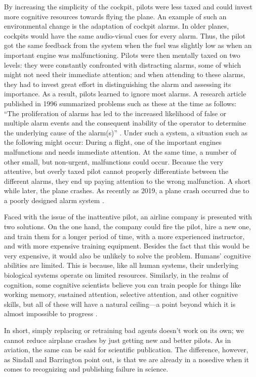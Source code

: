 \documentclass[editorial, authordate,twocolumn,issue]{jote-new-article}
\begin{document}
By increasing the simplicity of the cockpit, pilots were less taxed and could invest more cognitive resources towards flying the plane. An example of such an environmental change is the adaptation of cockpit alarms. In older planes, cockpits would have the same audio-visual cues for every alarm. Thus, the pilot got the same feedback from the system when the fuel was slightly low as when an important engine was malfunctioning. Pilots were then mentally taxed on two levels: they were constantly confronted with distracting alarms, some of which might not need their immediate attention; and when attending to these alarms, they had to invest great effort in distinguishing the alarm and assessing its importance. As a result, pilots learned to ignore most alarms. A research article published in 1996 summarized problems such as these at the time as follows: “The proliferation of alarms has led to the increased likelihood of false or multiple alarm events and the consequent inability of the operator to determine the underlying cause of the alarm(s)” \parencite[pp. 12]{Gilson1996}. Under such a system, a situation such as the following might occur: During a flight, one of the important engines malfunctions and needs immediate attention. At the same time, a number of other small, but non-urgent, malfunctions could occur. Because the very attentive, but overly taxed pilot cannot properly differentiate between the different alarms, they end up paying attention to the wrong malfunction. A short while later, the plane crashes. As recently as 2019, a plane crash occurred due to a poorly designed alarm system \parencite{Levin2019}. 

Faced with the issue of the inattentive pilot, an airline company is presented with two solutions. On the one hand, the company could fire the pilot, hire a new one, and train them for a longer period of time, with a more experienced instructor, and with more expensive training equipment. Besides the fact that this would be very expensive, it would also be unlikely to solve the problem. Humans' cognitive abilities are limited. This is because, like all human systems, their underlying biological systems operate on limited resources. Similarly, in the realms of cognition, some cognitive scientists believe you can train people for things like working memory, sustained attention, selective attention, and other cognitive skills, but all of these will have a natural ceiling—a point beyond which it is almost impossible to progress \parencite{Kwok2011, Traut2021}. 

In short, simply replacing or retraining bad agents doesn't work on its own; we cannot reduce airplane crashes by just getting new and better pilots. As in aviation, the same can be said for scientific publication. The difference, however, as Sindall and Barrington point out, is that we are already in a nosedive when it comes to recognizing and publishing failure in science. 
\end{document}

